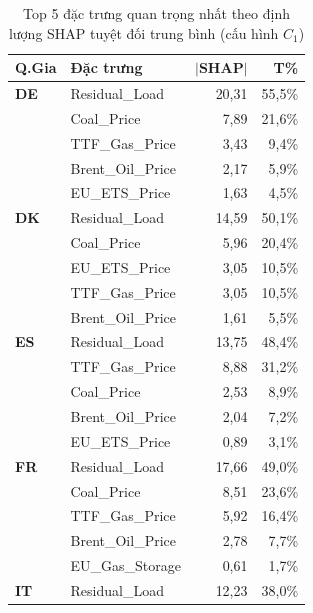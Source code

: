 \begin{table}[h!]
  \centering
  \footnotesize
  \setlength{\tabcolsep}{4pt}
  \caption{Top 5 đặc trưng quan trọng nhất theo định lượng SHAP tuyệt đối trung bình (cấu hình $C_1$)}
  \label{tab:shap_top5}
  \vspace{0.1cm}
  \begin{tabular*}{\columnwidth}{@{\extracolsep{\fill}}llrr@{}}
    \toprule
    \textbf{Q.Gia} & \textbf{Đặc trưng} & \textbf{$|\mathbf{SHAP}|$} & \textbf{T\%} \\
    \midrule
    \textbf{DE} & Residual\_Load     & 20,31 & 55,5\% \\
                & Coal\_Price        &  7,89 & 21,6\% \\
                & TTF\_Gas\_Price    &  3,43 &  9,4\% \\
                & Brent\_Oil\_Price  &  2,17 &  5,9\% \\
                & EU\_ETS\_Price     &  1,63 &  4,5\% \\
    \midrule
    \textbf{DK} & Residual\_Load     & 14,59 & 50,1\% \\
                & Coal\_Price        &  5,96 & 20,4\% \\
                & EU\_ETS\_Price     &  3,05 & 10,5\% \\
                & TTF\_Gas\_Price    &  3,05 & 10,5\% \\
                & Brent\_Oil\_Price  &  1,61 &  5,5\% \\
    \midrule
    \textbf{ES} & Residual\_Load     & 13,75 & 48,4\% \\
                & TTF\_Gas\_Price    &  8,88 & 31,2\% \\
                & Coal\_Price        &  2,53 &  8,9\% \\
                & Brent\_Oil\_Price  &  2,04 &  7,2\% \\
                & EU\_ETS\_Price     &  0,89 &  3,1\% \\
    \midrule
    \textbf{FR} & Residual\_Load     & 17,66 & 49,0\% \\
                & Coal\_Price        &  8,51 & 23,6\% \\
                & TTF\_Gas\_Price    &  5,92 & 16,4\% \\
                & Brent\_Oil\_Price  &  2,78 &  7,7\% \\
                & EU\_Gas\_Storage   &  0,61 &  1,7\% \\
    \midrule
    \textbf{IT} & Residual\_Load     & 12,23 & 38,0\% \\

\end{tabular*}
\end{table}
